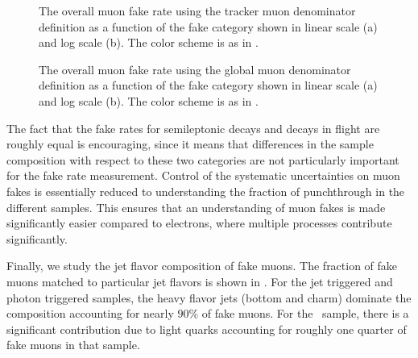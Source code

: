 \documentclass{cmspaper}
\begin{document}
\begin{figure}[htb]
\begin{center}
   \caption{The overall muon fake rate using the tracker muon denominator definition as a function of the fake category shown in linear scale (a) and log scale (b). The color scheme is as in .}
   \label{fig:TrackerMuonFakeRate_FakeCategory}
\end{center}
\end{figure}

\begin{figure}[htb]
\begin{center}
   \caption{The overall muon fake rate using the global muon denominator definition as a function of the fake category shown in linear scale (a) and log scale (b). The color scheme is as in .}
   \label{fig:GlobalMuonFakeRate_FakeCategory}
\end{center}
\end{figure}

The fact that the fake rates for semileptonic decays and decays in flight are roughly equal is encouraging, since it means that differences in the sample composition with respect to these two categories are not particularly important for the fake rate measurement. Control of the systematic uncertainties on muon fakes is essentially reduced to understanding the fraction of punchthrough in the different samples. This ensures that an understanding of muon fakes is made significantly easier compared to electrons, where multiple processes contribute significantly.


Finally, we study the jet flavor composition of fake muons. The fraction of fake muons matched to particular jet flavors is shown in . For the jet triggered and photon triggered samples, the heavy flavor jets (bottom and charm) dominate the composition accounting for nearly $90\%$ of fake muons. For the \WPlusJets\ sample, there is a significant contribution due to light quarks accounting for roughly one quarter of fake muons in that sample. 
\end{document}
